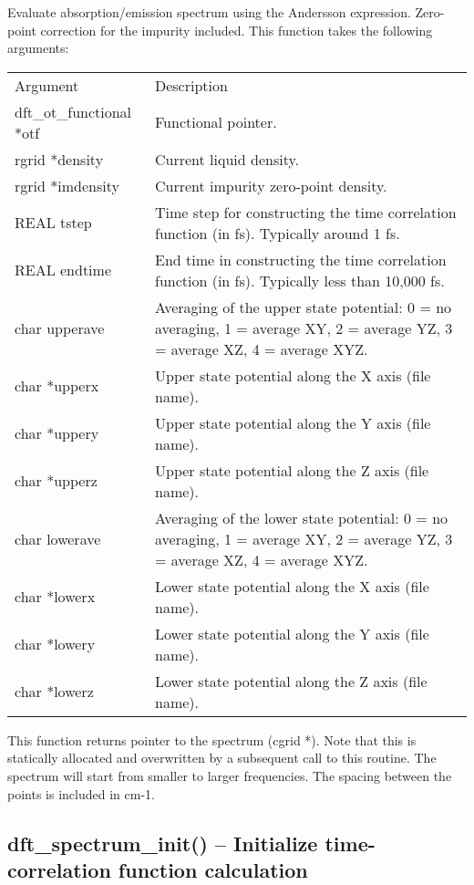 \documentclass[12pt,letterpaper]{report}
\begin{document}
Evaluate absorption/emission spectrum using the Andersson expression. Zero-point correction for the impurity included. This function takes the following arguments:
\begin{longtable}{p{} p{}}
Argument & Description\\
\cline{1-2}
dft\_ot\_functional *otf & Functional pointer.\\
rgrid *density & Current liquid density.\\
rgrid *imdensity & Current impurity zero-point density.\\
REAL tstep & Time step for constructing the time correlation function (in fs). Typically around 1 fs.\\
REAL endtime & End time in constructing the time correlation function (in fs). Typically less than 10,000 fs.\\
char upperave & Averaging of the upper state potential: 0 = no averaging, 1 = average XY, 2 = average YZ, 3 = average XZ, 4 = average XYZ.\\
char *upperx & Upper state potential along the X axis (file name).\\
char *uppery & Upper state potential along the Y axis (file name).\\
char *upperz & Upper state potential along the Z axis (file name).\\
char lowerave & Averaging of the lower state potential: 0 = no averaging, 1 = average XY, 2 = average YZ, 3 = average XZ, 4 = average XYZ.\\
char *lowerx & Lower state potential along the X axis (file name).\\
char *lowery & Lower state potential along the Y axis (file name).\\
char *lowerz & Lower state potential along the Z axis (file name).\\
\end{longtable}
\noindent
This function returns pointer to the spectrum (cgrid *). Note that this is statically allocated and overwritten by a subsequent call to this routine. The spectrum will start from smaller to larger frequencies. The spacing between the points is included in cm-1.

\subsection{dft\_spectrum\_init() -- Initialize time-correlation function calculation}
\end{document}
